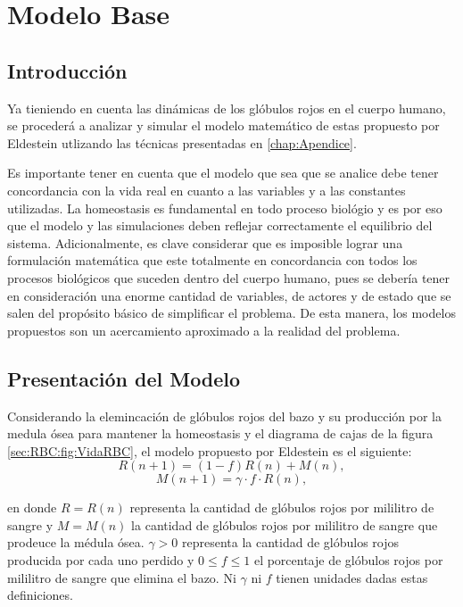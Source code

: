 
\chapter{Modelo Base}\label{chap:modelo}
\section{Introducción}\label{sec:modelo:intro}
Ya tieniendo en cuenta las dinámicas de los glóbulos rojos en el cuerpo humano, se procederá a analizar y simular el modelo matemático de estas propuesto por Eldestein \cite{edelstein2005} utlizando las técnicas presentadas en \ref{chap:Apendice}. 

Es importante tener en cuenta que el modelo que sea que se analice debe tener concordancia con la vida real en cuanto a las variables y a las constantes utilizadas. La homeostasis es fundamental en todo proceso biológio y es por eso que el modelo y las simulaciones deben reflejar correctamente el equilibrio del sistema. Adicionalmente, es clave considerar que es imposible lograr una formulación matemática que este totalmente en concordancia con todos los procesos biológicos que suceden dentro del cuerpo humano, pues se debería tener en consideración una enorme cantidad de variables, de actores y de estado que se salen del propósito básico de simplificar el problema. De esta manera, los modelos propuestos son un acercamiento aproximado a la realidad del problema.

\section{Presentación del Modelo}\label{sec:modelo:presentacion}
Considerando la elemincación de glóbulos rojos del bazo y su producción por la medula ósea para mantener la homeostasis y el diagrama de cajas de la figura \ref{sec:RBC:fig:VidaRBC}, el modelo propuesto por Eldestein es el siguiente:
$$R(n+1)=(1-f)R(n)+M(n),$$
$$M(n+1)=\gamma \cdot f\cdot R(n),$$

en donde $R=R(n)$ representa la cantidad de glóbulos rojos por mililitro de sangre y $M=M(n)$ la cantidad de glóbulos rojos por mililitro de sangre que prodeuce la médula ósea. $\gamma>0$ representa la cantidad de glóbulos rojos producida por cada uno perdido y $0\leq f \leq 1$ el porcentaje de glóbulos rojos por mililitro de sangre que elimina el bazo. Ni $\gamma$ ni $f$ tienen unidades dadas estas definiciones.

